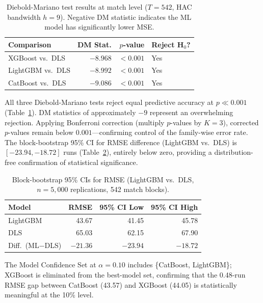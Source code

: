 \documentclass[10pt,a4paper,twocolumn]{article}
\begin{document}
\begin{table}[htbp]
\centering
\caption{Diebold-Mariano test results at match level ($T=542$, HAC bandwidth $h=9$). Negative DM statistic indicates the ML model has significantly lower MSE.}
\label{tab:dm_tests}
\small
\begin{tabular}{lrrl}
\toprule
\textbf{Comparison} & \textbf{DM Stat.} & \textbf{$p$-value} & \textbf{Reject H$_0$?} \\
\midrule
XGBoost vs.\ DLS  & $-8.968$ & $<0.001$ & Yes \\
LightGBM vs.\ DLS & $-8.992$ & $<0.001$ & Yes \\
CatBoost vs.\ DLS & $-9.086$ & $<0.001$ & Yes \\
\bottomrule
\end{tabular}
\end{table}

All three Diebold-Mariano tests reject equal predictive accuracy at $p \ll 0.001$ (Table~\ref{tab:dm_tests}). DM statistics of approximately $-9$ represent an overwhelming rejection. Applying Bonferroni correction (multiply $p$-values by $K=3$), corrected $p$-values remain below $0.001$---confirming control of the family-wise error rate. The block-bootstrap 95\% CI for RMSE difference (LightGBM vs.\ DLS) is $[-23.94, -18.72]$ runs (Table~\ref{tab:bootstrap}), entirely below zero, providing a distribution-free confirmation of statistical significance.

\begin{table}[htbp]
\centering
\caption{Block-bootstrap 95\% CIs for RMSE (LightGBM vs.\ DLS, $n=5{,}000$ replications, 542 match blocks).}
\label{tab:bootstrap}
\small
\begin{tabular}{lrrr}
\toprule
\textbf{Model} & \textbf{RMSE} & \textbf{95\% CI Low} & \textbf{95\% CI High} \\
\midrule
LightGBM    & 43.67 & 41.45 & 45.78 \\
DLS         & 65.03 & 62.15 & 67.90 \\
\midrule
Diff.\ (ML$-$DLS) & $-21.36$ & $-23.94$ & $-18.72$ \\
\bottomrule
\end{tabular}
\end{table}

The Model Confidence Set at $\alpha=0.10$ includes \{CatBoost, LightGBM\}; XGBoost is eliminated from the best-model set, confirming that the 0.48-run RMSE gap between CatBoost (43.57) and XGBoost (44.05) is statistically meaningful at the 10\% level.
\end{document}
